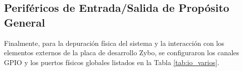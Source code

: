 
\subsection{Periféricos de Entrada/Salida de Propósito General}
Finalmente, para la depuración física del sistema y la interacción con los elementos externos de la placa de desarrollo Zybo, se configuraron los canales GPIO y los puertos físicos globales listados en la Tabla \ref{tab:io_varios}.


